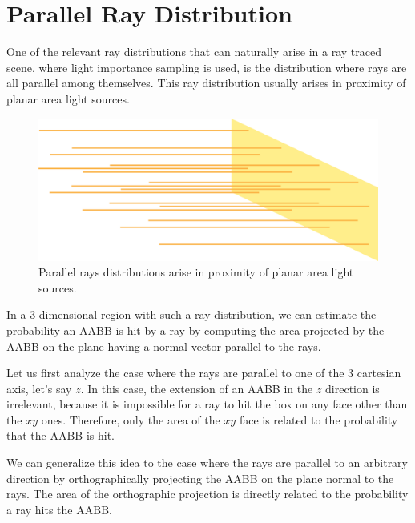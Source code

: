 \documentclass{PoliMi_MasterThesis}
\begin{document}
\section{Parallel Ray Distribution} \label{sec:parallel_ray_distribution}
One of the relevant ray distributions that can naturally arise in a ray traced scene, where light importance sampling is used, is the distribution where rays are all parallel among themselves. This ray distribution usually arises in proximity of planar area light sources.

\begin{figure}[H]
    \centering
    \includegraphics[width=\textwidth*\real{0.5}]{Images/plane_light_rays.png}
    \caption{Parallel rays distributions arise in proximity of planar area light sources.}
    \label{fig:parallel_rays_distribution}
\end{figure}

In a 3-dimensional region with such a ray distribution, we can estimate the probability an AABB is hit by a ray by computing the area projected by the AABB on the plane having a normal vector parallel to the rays.

Let us first analyze the case where the rays are parallel to one of the 3 cartesian axis, let's say $z$. In this case, the extension of an AABB in the $z$ direction is irrelevant, because it is impossible for a ray to hit the box on any face other than the $xy$ ones. Therefore, only the area of the $xy$ face is related to the probability that the AABB is hit.

We can generalize this idea to the case where the rays are parallel to an arbitrary direction by orthographically projecting the AABB on the plane normal to the rays. The area of the orthographic projection is directly related to the probability a ray hits the AABB.
\end{document}

